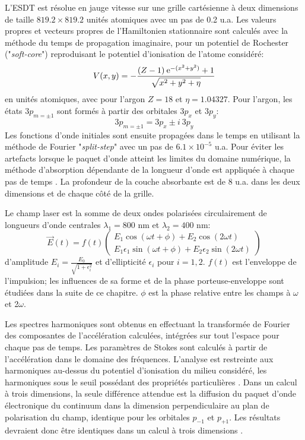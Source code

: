 L'ESDT est résolue en jauge vitesse sur une grille cartésienne à deux dimensions de taille $819.2 \times 819.2$ unités atomiques avec un pas de 0.2 u.a. Les valeurs propres et vecteurs propres de l'Hamiltonien stationnaire sont calculés avec la méthode du temps de propagation imaginaire, pour un potentiel de Rochester ("\textit{soft-core}") reproduisant le potentiel d'ionisation de l'atome considéré:
\begin{equation}
V(x,y) = - \frac{(Z-1) \: \mathrm{e}^{-(x^2+y^2)}+1}{\sqrt{x^2 + y^2 + \eta}}
\end{equation}
en unités atomiques, avec pour l'argon $Z = 18$ et $\eta = 1.04327$. Pour l'argon, les états $3p_{m=\pm 1}$ sont formés à partir des orbitales $3p_x$ et $3p_y$:
\begin{equation}
3p_{m=\pm 1} = 3p_x \pm i \: 3p_y
\end{equation}
Les fonctions d'onde initiales sont ensuite propagées dans le temps en utilisant la méthode de Fourier "\textit{split-step}"  avec un pas de $6.1 \times 10^{-5}$ u.a. Pour éviter les artefacts lorsque le paquet d'onde atteint les limites du domaine numérique, la méthode d'absorption dépendante de la longueur d'onde est appliquée à chaque pas de temps . La profondeur de la couche absorbante est de 8 u.a. dans les deux dimensions et de chaque côté de la grille.

Le champ laser est la somme de deux ondes polarisées circulairement de longueurs d'onde centrales $\lambda_1 = 800$ nm et $\lambda_2 = 400$ nm:
\begin{equation}
\vec{E}(t) = f(t) \begin{pmatrix}
E_1 \cos (\omega t + \phi) + E_2 \cos (2\omega t) \\
E_1 \epsilon_1 \sin (\omega t + \phi) + E_2 \epsilon_2 \sin (2\omega t)
\end{pmatrix}
\label{eq:champTA}
\end{equation}
d'amplitude $E_i = \frac{E_0}{\sqrt{1 + \epsilon_i^2}}$ et d'ellipticité $\epsilon_i$ pour $i = 1,2$. $f(t)$ est l'enveloppe de l'impulsion; les influences de sa forme et de la phase porteuse-enveloppe sont étudiées dans la suite de ce chapitre. $\phi$ est la phase relative entre les champs à $\omega$ et 2$\omega$.

Les spectres harmoniques sont obtenus en effectuant la transformée de Fourier des composantes de l'accélération calculées, intégrées sur tout l'espace pour chaque pas de temps. Les paramètres de Stokes sont calculés à partir de l'accélération dans le domaine des fréquences. L'analyse est restreinte aux harmoniques au-dessus du potentiel d'ionisation du milieu considéré, les harmoniques sous le seuil possédant des propriétés particulières . Dans un calcul à trois dimensions, la seule différence attendue est la diffusion du paquet d'onde électronique du continuum dans la dimension perpendiculaire au plan de polarisation du champ, identique pour les orbitales $p_{-1}$ et $p_{+1}$. Les résultats devraient donc être identiques dans un calcul à trois dimensions .


